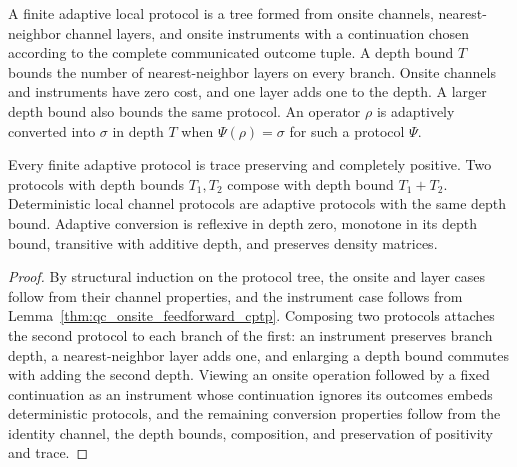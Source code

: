 \begin{definition}
    \label{def:qc_adaptive_protocol}
    \leanok
    A finite adaptive local protocol is a tree formed from onsite channels,
    nearest-neighbor channel layers, and onsite instruments with a
    continuation chosen according to the complete communicated outcome tuple.
    A depth bound $T$ bounds the number of nearest-neighbor layers on every
    branch. Onsite channels and instruments have zero cost, and one layer
    adds one to the depth. A larger depth bound also bounds the same protocol.
    An operator $\rho$ is adaptively converted into $\sigma$ in depth $T$
    when $\Psi(\rho)=\sigma$ for such a protocol $\Psi$.
\end{definition}

\begin{lemma}
    \label{thm:qc_adaptive_protocol_properties}
    \leanok
    Every finite adaptive protocol is trace preserving and completely
    positive. Two protocols with depth bounds $T_1,T_2$ compose with depth
    bound $T_1+T_2$. Deterministic local channel protocols are adaptive
    protocols with the same depth bound. Adaptive conversion is reflexive
    in depth zero, monotone in its depth bound, transitive with additive
    depth, and preserves density matrices.
\end{lemma}
\begin{proof}
    \leanok
    By structural induction on the protocol tree, the onsite and layer cases
    follow from their channel properties, and the instrument case follows from
    Lemma~\ref{thm:qc_onsite_feedforward_cptp}. Composing two protocols
    attaches the second protocol to each branch of the first: an instrument
    preserves branch depth, a nearest-neighbor layer adds one, and enlarging
    a depth bound commutes with adding the second depth. Viewing an onsite
    operation followed by a fixed continuation as an instrument whose
    continuation ignores its outcomes embeds deterministic protocols, and the
    remaining conversion properties follow from the identity channel, the
    depth bounds, composition, and preservation of positivity and trace.
\end{proof}

